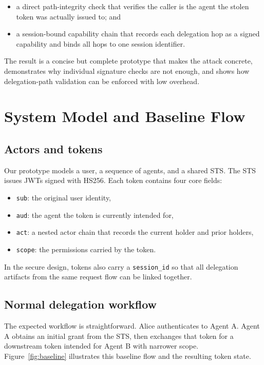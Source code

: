 \documentclass[11pt]{article}
\begin{document}
\begin{itemize}
  \item a direct path-integrity check that verifies the caller is the agent the stolen token was actually issued to; and
  \item a session-bound capability chain that records each delegation hop as a signed capability and binds all hops to one session identifier.
\end{itemize}

The result is a concise but complete prototype that makes the attack concrete, demonstrates why individual signature checks are not enough, and shows how delegation-path validation can be enforced with low overhead.

\section{System Model and Baseline Flow}
\subsection{Actors and tokens}
Our prototype models a user, a sequence of agents, and a shared STS. The STS issues JWTs signed with HS256. Each token contains four core fields:

\begin{itemize}
  \item \texttt{sub}: the original user identity,
  \item \texttt{aud}: the agent the token is currently intended for,
  \item \texttt{act}: a nested actor chain that records the current holder and prior holders,
  \item \texttt{scope}: the permissions carried by the token.
\end{itemize}

In the secure design, tokens also carry a \texttt{session\_id} so that all delegation artifacts from the same request flow can be linked together.

\subsection{Normal delegation workflow}
The expected workflow is straightforward. Alice authenticates to Agent A. Agent A obtains an initial grant from the STS, then exchanges that token for a downstream token intended for Agent B with narrower scope. Figure~\ref{fig:baseline} illustrates this baseline flow and the resulting token state.
\end{document}
